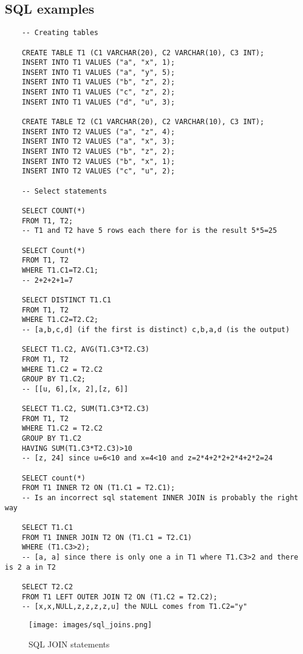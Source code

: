 \documentclass{article}
\begin{document}
\subsection{SQL examples}
\begin{verbatim}
    -- Creating tables

    CREATE TABLE T1 (C1 VARCHAR(20), C2 VARCHAR(10), C3 INT);
    INSERT INTO T1 VALUES ("a", "x", 1);
    INSERT INTO T1 VALUES ("a", "y", 5);
    INSERT INTO T1 VALUES ("b", "z", 2);
    INSERT INTO T1 VALUES ("c", "z", 2);
    INSERT INTO T1 VALUES ("d", "u", 3);

    CREATE TABLE T2 (C1 VARCHAR(20), C2 VARCHAR(10), C3 INT);
    INSERT INTO T2 VALUES ("a", "z", 4);
    INSERT INTO T2 VALUES ("a", "x", 3);
    INSERT INTO T2 VALUES ("b", "z", 2);
    INSERT INTO T2 VALUES ("b", "x", 1);
    INSERT INTO T2 VALUES ("c", "u", 2);

    -- Select statements
    
    SELECT COUNT(*)
    FROM T1, T2; 
    -- T1 and T2 have 5 rows each there for is the result 5*5=25

    SELECT Count(*)
    FROM T1, T2
    WHERE T1.C1=T2.C1; 
    -- 2+2+2+1=7

    SELECT DISTINCT T1.C1
    FROM T1, T2
    WHERE T1.C2=T2.C2;
    -- [a,b,c,d] (if the first is distinct) c,b,a,d (is the output)

    SELECT T1.C2, AVG(T1.C3*T2.C3)
    FROM T1, T2
    WHERE T1.C2 = T2.C2
    GROUP BY T1.C2;
    -- [[u, 6],[x, 2],[z, 6]]

    SELECT T1.C2, SUM(T1.C3*T2.C3)
    FROM T1, T2
    WHERE T1.C2 = T2.C2
    GROUP BY T1.C2
    HAVING SUM(T1.C3*T2.C3)>10  
    -- [z, 24] since u=6<10 and x=4<10 and z=2*4+2*2+2*4+2*2=24 

    SELECT count(*)
    FROM T1 INNER T2 ON (T1.C1 = T2.C1);  
    -- Is an incorrect sql statement INNER JOIN is probably the right way

    SELECT T1.C1
    FROM T1 INNER JOIN T2 ON (T1.C1 = T2.C1)
    WHERE (T1.C3>2);
    -- [a, a] since there is only one a in T1 where T1.C3>2 and there is 2 a in T2

    SELECT T2.C2
    FROM T1 LEFT OUTER JOIN T2 ON (T1.C2 = T2.C2);
    -- [x,x,NULL,z,z,z,z,u] the NULL comes from T1.C2="y"

\end{verbatim}
\begin{figure}[!h]
    \centering
    \texttt{[image: images/sql\_joins.png]}
    \caption{SQL JOIN statements}
    \label{fig:sql_joins}
\end{figure}
\end{document}
